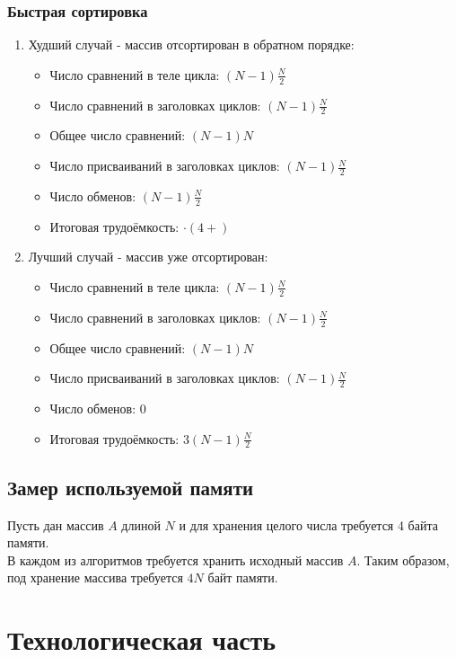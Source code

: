 \documentclass[12pt, a4paper]{report}
\begin{document}
	\subsection{Быстрая сортировка}
		\begin{enumerate}
		\item Худший случай - массив отсортирован в обратном порядке:
		\begin{itemize}
			\item Число сравнений в теле цикла: $(N-1)\frac{N}{2}$
			\item Число сравнений в заголовках циклов: $(N-1)\frac{N}{2}$
			\item Общее число сравнений: $(N-1)N$
			\item Число присваиваний в заголовках циклов: $(N-1)\frac{N}{2}$
			\item Число обменов: $(N-1)\frac{N}{2}$\\
			\item Итоговая трудоёмкость: $\cdot (4 + )$
		\end{itemize}
		\item Лучший случай - массив уже отсортирован:
		\begin{itemize}
			\item Число сравнений в теле цикла: $(N-1)\frac{N}{2}$
			\item Число сравнений в заголовках циклов: $(N-1)\frac{N}{2}$
			\item Общее число сравнений: $(N-1)N$
			\item Число присваиваний в заголовках циклов: $(N-1)\frac{N}{2}$
			\item Число обменов: $0$\\
			\item Итоговая трудоёмкость: $3(N-1)\frac{N}{2}$
		\end{itemize}
	\end{enumerate}

	\section{Замер используемой памяти}
	Пусть дан массив $A$ длиной $N$ и для хранения целого числа требуется 4 байта памяти.\\
	В каждом из алгоритмов требуется хранить исходный массив $A$. Таким образом, под хранение массива требуется $4N$ байт памяти.\\
	
	\chapter{Технологическая часть}
\end{document}
